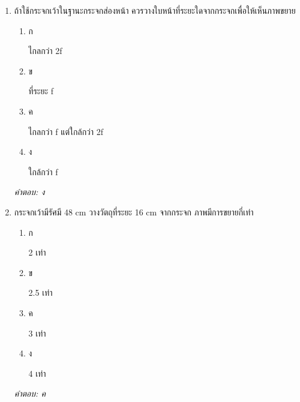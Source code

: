 \documentclass[12pt]{article}
\begin{document}
\begin{enumerate}[label=\arabic*., itemsep=0.5\baselineskip, topsep=0.5\baselineskip, leftmargin=*]
\item ถ้าใช้กระจกเว้าในฐานะกระจกส่องหน้า ควรวางใบหน้าที่ระยะใดจากกระจกเพื่อให้เห็นภาพขยาย
\begin{enumerate}[label=\alph*)., itemsep=0.3\baselineskip, topsep=0.3\baselineskip]
\item ก\ 
\begin{minipage}[t]{0.9\linewidth}
\raggedright ไกลกว่า 2f
\end{minipage}
\item ข\ 
\begin{minipage}[t]{0.9\linewidth}
\raggedright ที่ระยะ f
\end{minipage}
\item ค\ 
\begin{minipage}[t]{0.9\linewidth}
\raggedright ไกลกว่า f แต่ใกล้กว่า 2f
\end{minipage}
\item ง\ 
\begin{minipage}[t]{0.9\linewidth}
\raggedright ใกล้กว่า f
\end{minipage}
\end{enumerate}
\vspace{-0.3\baselineskip}
\begin{small}
\textit{คำตอบ: ง}
\end{small}

\item กระจกเว้ามีรัศมี 48 cm วางวัตถุที่ระยะ 16 cm จากกระจก ภาพมีการขยายกี่เท่า
\begin{enumerate}[label=\alph*)., itemsep=0.3\baselineskip, topsep=0.3\baselineskip]
\item ก\ 
\begin{minipage}[t]{0.9\linewidth}
\raggedright 2 เท่า
\end{minipage}
\item ข\ 
\begin{minipage}[t]{0.9\linewidth}
\raggedright 2.5 เท่า
\end{minipage}
\item ค\ 
\begin{minipage}[t]{0.9\linewidth}
\raggedright 3 เท่า
\end{minipage}
\item ง\ 
\begin{minipage}[t]{0.9\linewidth}
\raggedright 4 เท่า
\end{minipage}
\end{enumerate}
\vspace{-0.3\baselineskip}
\begin{small}
\textit{คำตอบ: ค}
\end{small}


\end{enumerate}
\end{document}
